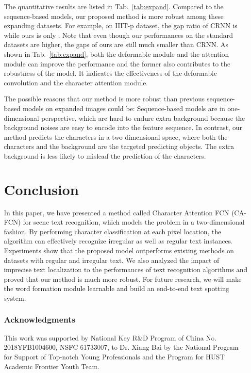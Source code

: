 \documentclass[letterpaper]{article} \usepackage{aaai19}  \usepackage{times}  \usepackage{helvet}  \usepackage{courier}  \usepackage{url}  \usepackage{graphicx}  \frenchspacing  \usepackage{multirow}
\begin{document}
The quantitative results are listed in Tab.~\ref{tab:expand}. Compared to the sequence-based models, our proposed method is more robust among these expanding datasets. For example, on IIIT-p dataset, the gap ratio of CRNN is  while ours is only . Note that even though our performances on the standard datasets are higher, the gaps of ours are still much smaller than CRNN. 
As shown in Tab.~\ref{tab:expand}, both the deformable module and the attention module can improve the performance and the former also contributes to the robustness of the model. It indicates the effectiveness of the deformable convolution and the character attention module.

The possible reasons that our method is more robust than previous sequence-based models on expanded images could be:
Sequence-based models are in one-dimensional perspective, which are hard to endure extra background because the background noises are easy to encode into the feature sequence. In contrast, our method predicts the characters in a two-dimensional space, where both the characters and the background are the targeted predicting objects. The extra background is less likely to mislead the prediction of the characters. 

\section{Conclusion}

In this paper, we have presented a method called Character Attention FCN (CA-FCN) for scene text recognition, which models the problem in a two-dimensional fashion. By performing character classification at each pixel location, the algorithm can effectively recognize irregular as well as regular text instances. Experiments show that the proposed model outperforms existing methods on datasets with regular and irregular text. We also analyzed the impact of imprecise text localization to the performances of text recognition algorithms and proved that our method is much more robust. For future research, we will make the word formation module learnable and build an end-to-end text spotting system.

\subsubsection*{Acknowledgments}
This work was supported by National Key R\&D Program of China No. 2018YFB1004600, NSFC 61733007, to Dr. Xiang Bai by the National Program for Support of Top-notch Young Professionals and the Program for HUST Academic Frontier Youth Team.



\end{document}
